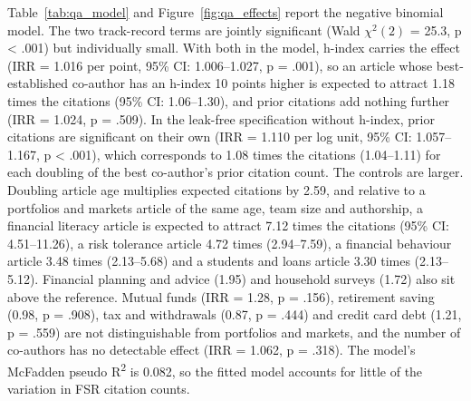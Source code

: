 \documentclass[11pt,a4paper]{article}
\begin{document}
Table~\ref{tab:qa_model} and Figure~\ref{fig:qa_effects} report the negative binomial model. The two track-record terms are jointly significant (Wald \(\chi^2(2)\) = 25.3, p \textless{} .001) but individually small. With both in the model, h-index carries the effect (IRR = 1.016 per point, 95\% CI: 1.006--1.027, p = .001), so an article whose best-established co-author has an h-index 10 points higher is expected to attract 1.18 times the citations (95\% CI: 1.06--1.30), and prior citations add nothing further (IRR = 1.024, p = .509). In the leak-free specification without h-index, prior citations are significant on their own (IRR = 1.110 per log unit, 95\% CI: 1.057--1.167, p \textless{} .001), which corresponds to 1.08 times the citations (1.04--1.11) for each doubling of the best co-author's prior citation count. The controls are larger. Doubling article age multiplies expected citations by 2.59, and relative to a portfolios and markets article of the same age, team size and authorship, a financial literacy article is expected to attract 7.12 times the citations (95\% CI: 4.51--11.26), a risk tolerance article 4.72 times (2.94--7.59), a financial behaviour article 3.48 times (2.13--5.68) and a students and loans article 3.30 times (2.13--5.12). Financial planning and advice (1.95) and household surveys (1.72) also sit above the reference. Mutual funds (IRR = 1.28, p = .156), retirement saving (0.98, p = .908), tax and withdrawals (0.87, p = .444) and credit card debt (1.21, p = .559) are not distinguishable from portfolios and markets, and the number of co-authors has no detectable effect (IRR = 1.062, p = .318). The model's McFadden pseudo R\textsuperscript{2} is 0.082, so the fitted model accounts for little of the variation in FSR citation counts.
\end{document}
